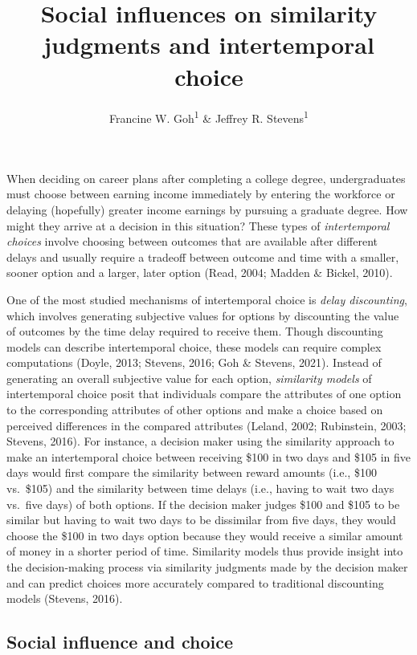 \documentclass[
  pub,floatsintext]{apa6}
\title{Social influences on similarity judgments and intertemporal choice}
\author{Francine W. Goh\textsuperscript{1} \& Jeffrey R. Stevens\textsuperscript{1}}
\date{}
\affiliation{\vspace{0.5cm}\textsuperscript{1} University of Nebraska-Lincoln}
\begin{document}
\maketitle

When deciding on career plans after completing a college degree, undergraduates must choose between earning income immediately by entering the workforce or delaying (hopefully) greater income earnings by pursuing a graduate degree. How might they arrive at a decision in this situation? These types of \emph{intertemporal choices} involve choosing between outcomes that are available after different delays and usually require a tradeoff between outcome and time with a smaller, sooner option and a larger, later option (Read, 2004; Madden \& Bickel, 2010).

One of the most studied mechanisms of intertemporal choice is \emph{delay discounting}, which involves generating subjective values for options by discounting the value of outcomes by the time delay required to receive them. Though discounting models can describe intertemporal choice, these models can require complex computations (Doyle, 2013; Stevens, 2016; Goh \& Stevens, 2021). Instead of generating an overall subjective value for each option, \emph{similarity models} of intertemporal choice posit that individuals compare the attributes of one option to the corresponding attributes of other options and make a choice based on perceived differences in the compared attributes (Leland, 2002; Rubinstein, 2003; Stevens, 2016). For instance, a decision maker using the similarity approach to make an intertemporal choice between receiving \$100 in two days and \$105 in five days would first compare the similarity between reward amounts (i.e., \$100 vs.~\$105) and the similarity between time delays (i.e., having to wait two days vs.~five days) of both options. If the decision maker judges \$100 and \$105 to be similar but having to wait two days to be dissimilar from five days, they would choose the \$100 in two days option because they would receive a similar amount of money in a shorter period of time. Similarity models thus provide insight into the decision-making process via similarity judgments made by the decision maker and can predict choices more accurately compared to traditional discounting models (Stevens, 2016).

\hypertarget{social-influence-and-choice}{%
\subsection{Social influence and choice}\label{social-influence-and-choice}}
\end{document}
